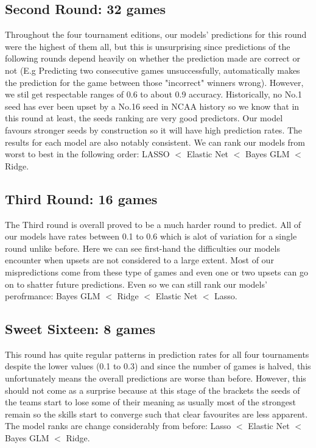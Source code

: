 \documentclass{article} %
\begin{document}
\subsection{Second Round: 32 games}

Throughout the four tournament editions, our models' predictions for this round were the highest of them all, but this is unsurprising since predictions of the following rounds depend heavily on whether the prediction made are correct or not (E.g Predicting two consecutive games unsuccessfully, automatically makes the prediction for the game between those "incorrect" winners wrong). However, we stil get respectable ranges of 0.6 to about 0.9 accuracy. Historically, no No.1 seed has ever been upset by a No.16 seed in NCAA history so we know that in this round at least, the seeds ranking are very good predictors. Our model favours stronger seeds by construction so it will have high prediction rates. The results for each model are also notably consistent. We can rank our models from worst to best in the following order: LASSO $<$ Elastic Net $<$ Bayes GLM $<$ Ridge.

\subsection{Third Round: 16 games}

The Third round is overall proved to be a much harder round to predict. All of our models have rates between 0.1 to 0.6 which is alot of variation for a single round unlike before. Here we can see first-hand the difficulties our models encounter when upsets are not considered to a large extent. Most of our mispredictions come from these type of games and even one or two upsets can go on to shatter future predictions. Even so we can still rank our models' perofrmance: Bayes GLM $<$ Ridge $<$ Elastic Net $<$ Lasso.

\subsection{Sweet Sixteen: 8 games}

This round has quite regular patterns in prediction rates for all four tournaments despite the lower values (0.1 to 0.3) and since the number of games is halved, this unfortunately means the overall predictions are worse than before. However, this should not come as a surprise because at this stage of the brackets the seeds of the teams start to lose some of their meaning as usually most of the strongest remain so the skills start to converge such that clear favourites are less apparent. The model ranks are change considerably from before: Lasso  $<$ Elastic Net $<$ Bayes GLM $<$ Ridge.   
\end{document}
